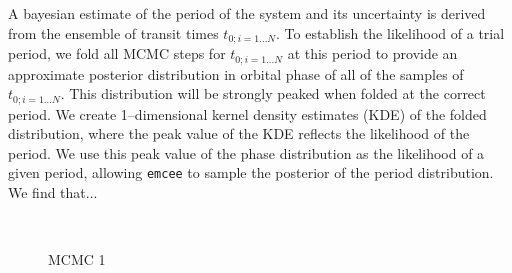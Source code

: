 A bayesian estimate of the period of the system and its uncertainty is
derived from the ensemble of transit times $t_{0;i=1...N}$.  To
establish the likelihood of a trial period, we fold all MCMC steps for
$t_{0;i=1...N}$ at this period to provide an approximate posterior
distribution in orbital phase of all of the samples of
$t_{0;i=1...N}$.  This distribution will be strongly peaked when
folded at the correct period.  We create 1--dimensional kernel density
estimates (KDE) of the folded distribution, where the peak value of
the KDE reflects the likelihood of the period.  We use this peak value
of the phase distribution as the likelihood of a given period,
allowing {\tt emcee} to sample the posterior of the period
distribution.  We find that...

\begin{figure}[t] 
\begin{center} 
\mbox{
\quad
{}
}
\caption{MCMC 1}
\label{fig-mcmc1} 
\end{center} 
\end{figure}

\medskip
{\centerline{}}
\smallskip

